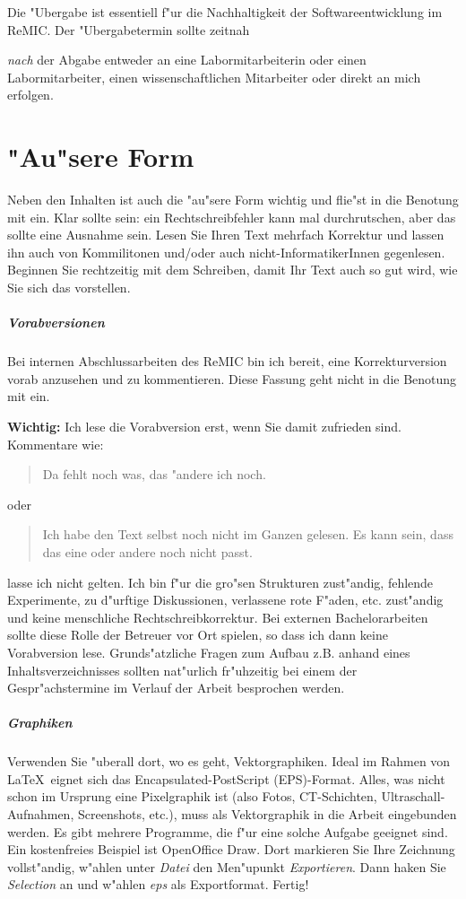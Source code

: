 \documentclass[12pt,a4paper,headinclude,twoside, plainheadsepline, open=right,numbers=noenddot]{scrreprt}
\begin{document}
Die "Ubergabe ist essentiell f"ur die Nachhaltigkeit der Softwareentwicklung im ReMIC.
Der "Ubergabetermin sollte zeitnah {\emph{nach} der Abgabe entweder an eine Labormitarbeiterin oder einen Labormitarbeiter, einen wissenschaftlichen Mitarbeiter oder direkt an mich erfolgen.

\chapter{"Au"sere Form}
\label{form}

Neben den Inhalten ist auch die "au"sere Form wichtig und flie"st in die Benotung mit ein.
Klar sollte sein: ein Rechtschreibfehler kann mal durchrutschen, aber das sollte eine Ausnahme sein.
Lesen Sie Ihren Text mehrfach Korrektur und lassen ihn auch von Kommilitonen und/oder auch nicht-InformatikerInnen gegenlesen.
Beginnen Sie rechtzeitig mit dem Schreiben, damit Ihr Text auch so gut wird, wie Sie sich das vorstellen.

\paragraph{Vorabversionen}
Bei internen Abschlussarbeiten des ReMIC bin ich bereit, eine Korrekturversion vorab anzusehen und zu kommentieren.
Diese Fassung geht nicht in die Benotung mit ein.

\textbf{Wichtig:} Ich lese die Vorabversion erst, wenn Sie damit zufrieden sind. Kommentare wie:
\begin{quote}
\glqq Da fehlt noch was, das "andere ich noch.\grqq
\end{quote}
oder
\begin{quote}
\glqq Ich habe den Text selbst noch nicht im Ganzen gelesen. Es kann sein, dass das eine oder andere noch nicht passt.\glqq
\end{quote}
lasse ich nicht gelten. Ich bin f"ur die gro"sen Strukturen zust"andig, fehlende Experimente, zu d"urftige Diskussionen, verlassene rote F"aden, etc. zust"andig und keine menschliche Rechtschreibkorrektur.
Bei externen Bachelorarbeiten sollte diese Rolle der Betreuer vor Ort spielen, so dass ich dann keine Vorabversion lese.
Grunds"atzliche Fragen zum Aufbau z.B. anhand eines Inhaltsverzeichnisses sollten nat"urlich fr"uhzeitig bei einem der Gespr"achstermine im Verlauf der Arbeit besprochen werden.

\paragraph{Graphiken}
Verwenden Sie "uberall dort, wo es geht, Vektorgraphiken. Ideal im Rahmen von \LaTeX~eignet sich das Encapsulated-PostScript (EPS)-Format.
Alles, was nicht schon im Ursprung eine Pixelgraphik ist (also Fotos, CT-Schichten, Ultraschall-Aufnahmen, Screenshots, etc.), muss als Vektorgraphik in die Arbeit eingebunden werden.
Es gibt mehrere Programme, die f"ur eine solche Aufgabe geeignet sind. Ein kostenfreies Beispiel ist OpenOffice Draw.
Dort markieren Sie Ihre Zeichnung vollst"andig, w"ahlen unter \emph{Datei} den Men"upunkt \emph{Exportieren}.
Dann haken Sie \emph{Selection} an und w"ahlen \emph{eps} als Exportformat.
Fertig!

}
\end{document}
